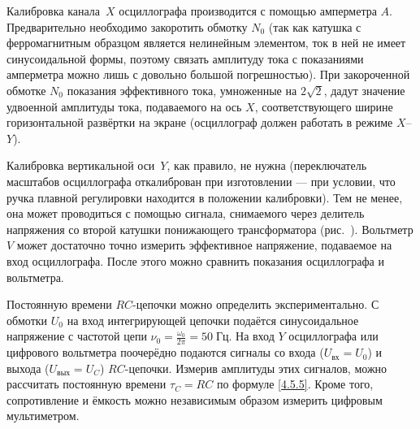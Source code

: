 

Калибровка канала~$X$ осциллографа производится с помощью амперметра $A$.
Предварительно необходимо закоротить обмотку $N_0$
(так как катушка с ферромагнитным образцом является
нелинейным элементом, ток в ней не имеет синусоидальной формы,
поэтому связать амплитуду тока с показаниями амперметра можно лишь
с довольно большой погрешностью). При закороченной обмотке $N_0$
показания эффективного тока, умноженные на $2\sqrt{2}$,
дадут значение удвоенной амплитуды тока, подаваемого на ось $X$,
соответствующего ширине горизонтальной развёртки на экране
(осциллограф должен работать в режиме $X$--$Y$).

Калибровка вертикальной оси~$Y$, как правило, не нужна
(переключатель масштабов осциллографа откалиброван при изготовлении ---
при условии, что ручка плавной регулировки находится в положении
калибровки). Тем не менее, она может проводиться с помощью сигнала,
снимаемого через делитель напряжения со второй катушки понижающего трансформатора
(рис.~). Вольтметр $V$ может достаточно точно
измерить эффективное напряжение, подаваемое на вход осциллографа. После
этого можно сравнить показания осциллографа и вольтметра.


Постоянную времени $RC$-цепочки можно определить экспериментально.
С обмотки $U_0$ на вход интегрирующей цепочки подаётся синусоидальное напряжение
с частотой цепи $\nu_0=\frac{\omega_0}{2\pi}=50\;Гц$.
На вход $Y$ осциллографа или цифрового вольтметра поочерёдно
подаются сигналы со входа ($U_\text{вх}=U_0$) и выхода ($U_\text{вых} = U_C$)
$RC$-цепочки. Измерив амплитуды этих сигналов, можно рассчитать постоянную
времени $\tau_C= RC$ по формуле \eqref{4.5.5}.
Кроме того, сопротивление и ёмкость можно независимым образом измерить
цифровым мультиметром.

